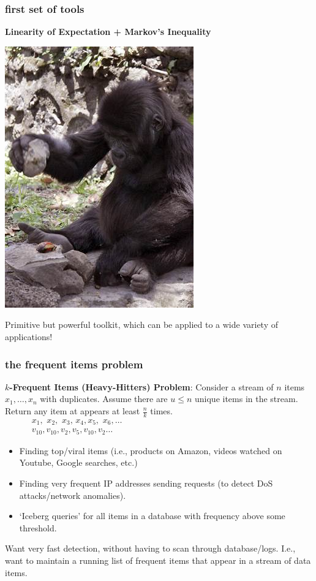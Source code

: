 \documentclass[]{beamer}
\begin{document}
	\begin{frame}
		\frametitle{first set of tools}
		\begin{center}
			\textbf{\large\alert{Linearity of Expectation + Markov's Inequality}}\vspace{.5em}
			
			\includegraphics[width=.3\textwidth]{monkey_using_tools.jpg}
			
			Primitive but powerful toolkit, which can be applied to a wide variety of applications!
		\end{center}	
	\end{frame}
	
	\begin{frame}
		\frametitle{the frequent items problem}
		\small
		\textbf{$k$-Frequent Items (Heavy-Hitters) Problem}: Consider a stream of $n$ items $x_1,\ldots, x_n$ with duplicates. Assume there are $u\leq n$ unique items in the stream. Return any item at appears at least $\frac{n}{k}$ times.
		\begin{align*}
			&x_1,\,\, x_2,\,\,x_3,\,x_4,x_5,\,\,x_6,\ldots\hspace{20em}\\
			&v_{10},v_{10},v_2,v_5,v_{10},v_2\ldots\hspace{20em}
		\end{align*}
		
		\begin{itemize}
			\item Finding top/viral items (i.e., products on Amazon, videos watched on Youtube, Google searches, etc.)
			\item Finding very frequent IP addresses sending requests (to detect DoS attacks/network anomalies).
			\item `Iceberg queries' for all items in a database with frequency above some threshold.
		\end{itemize}
		Want very fast detection, without having to scan through database/logs. I.e., want to maintain a running list of frequent items that appear in a stream of data items.
	\end{frame}
	
\end{document}
